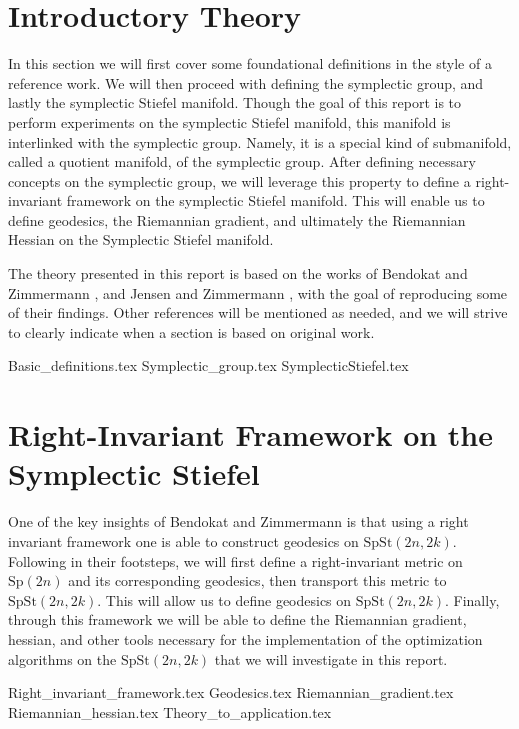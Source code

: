 \section{Introductory Theory}
In this section we will first cover some foundational definitions in the style of a reference work. We will then proceed with defining the symplectic group, and lastly the symplectic Stiefel manifold. Though the goal of this report is to perform experiments on the symplectic Stiefel manifold, this manifold is interlinked with the symplectic group. Namely, it is a special kind of submanifold, called a quotient manifold, of the symplectic group. After defining necessary concepts on the symplectic group, we will leverage this property to define a right-invariant framework on the symplectic Stiefel manifold. This will enable us to define geodesics, the Riemannian gradient, and ultimately the Riemannian Hessian on the Symplectic Stiefel manifold. 

The theory presented in this report is based on the works of Bendokat and Zimmermann \cite{BendokatZimmermann2021}, and Jensen and Zimmermann \cite{JensenZimmermann2024}, with the goal of reproducing some of their findings. Other references will be mentioned as needed, and we will strive to clearly indicate when a section is based on original work. 

{Basic_definitions.tex}
{Symplectic_group.tex}
{SymplecticStiefel.tex}

\section{Right-Invariant Framework on the Symplectic Stiefel}
One of the key insights of Bendokat and Zimmermann \cite[p.~11]{BendokatZimmermann2021} is that using a right invariant framework one is able to construct geodesics on $\mathrm{SpSt}(2n, 2k)$. Following in their footsteps, we will first define a right-invariant metric on $\mathrm{Sp}(2n)$ and its corresponding geodesics, then transport this metric to $\mathrm{SpSt}(2n, 2k)$. This will allow us to define geodesics on $\mathrm{SpSt}(2n, 2k)$. Finally, through this framework we will be able to define the Riemannian gradient, hessian, and other tools necessary for the implementation of the optimization algorithms on the $\mathrm{SpSt}(2n, 2k)$ that we will investigate in this report. 

{Right_invariant_framework.tex}
{Geodesics.tex}
{Riemannian_gradient.tex}
{Riemannian_hessian.tex}
{Theory_to_application.tex}
